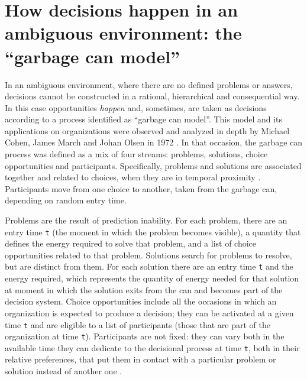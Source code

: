 \section{How decisions happen in an ambiguous environment: the ``garbage can model''}

In an ambiguous environment, where there are no defined problems or answers, decisions cannot be constructed in a rational, hierarchical and consequential way. In this case opportunities \textit{happen} and, sometimes, are taken as decisions according to a process identified as ``garbage can model''\cite{1, 2}. This model and its applications on organizations were observed and analyzed in depth by Michael Cohen, James March and Johan Olsen in 1972 \cite{1}. In that occasion, the garbage can process was defined as a mix of four streams: problems, solutions, choice opportunities and participants. Specifically, problems and solutions are associated together and related to choices, when they are in temporal proximity \cite{2}. Participants move from one choice to another, taken from the garbage can, depending on random entry time.

Problems are the result of prediction inability. For each problem, there are an entry time \texttt{t} (the moment in which the problem becomes visible), a quantity that defines the energy required to solve that problem, and a list of choice opportunities related to that problem. Solutions search for problems to resolve, but are distinct from them. For each solution there are an entry time \texttt{t} and the energy required, which represents the quantity of energy needed for that solution at moment in which the solution exits from the can and becomes part of the decision system. Choice opportunities include all the occasions in which an organization is expected to produce a decision; they  can be activated at a given time \texttt{t} and are eligible to a list of participants (those that are part of the organization at time \texttt{t}). Participants are not fixed: they can vary both in the available time they can dedicate to the decisional process at time \texttt{t}, both in their relative preferences, that put them in contact with a particular problem or solution instead of another one \cite{1}.

